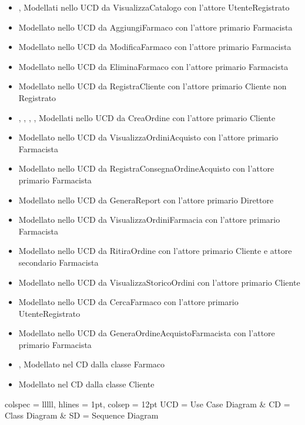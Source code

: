 \begin{itemize}
	\item {},  Modellati nello UCD da VisualizzaCatalogo con l'attore UtenteRegistrato
	\item {} Modellato nello UCD da AggiungiFarmaco con l'attore primario Farmacista
	\item {} Modellato nello UCD da ModificaFarmaco con l'attore primario Farmacista
	\item {} Modellato nello UCD da EliminaFarmaco con l'attore primario Farmacista
	\item {} Modellato nello UCD da RegistraCliente con l'attore primario Cliente non Registrato
	\item {}, , , ,  Modellati nello UCD da CreaOrdine con l'attore primario Cliente
	\item {} Modellato nello UCD da VisualizzaOrdiniAcquisto con l'attore primario Farmacista
	\item {} Modellato nello UCD da RegistraConsegnaOrdineAcquisto con l'attore primario Farmacista
	\item {} Modellato nello UCD da GeneraReport con l'attore primario Direttore
	\item {} Modellato nello UCD da VisualizzaOrdiniFarmacia con l'attore primario Farmacista
	\item {} Modellato nello UCD da RitiraOrdine con l'attore primario Cliente e attore secondario Farmacista
	\item {} Modellato nello UCD da VisualizzaStoricoOrdini con l'attore primario Cliente
	\item {} Modellato nello UCD da CercaFarmaco con l'attore primario UtenteRegistrato
	\item {} Modellato nello UCD da GeneraOrdineAcquistoFarmacista con l'attore primario Farmacista
	\item {},  Modellato nel CD dalla classe Farmaco
	\item {} Modellato nel CD dalla classe Cliente
\end{itemize}

\begin{table}[!hbp]
	\centering
	\begin{tblr}{
		colspec = lllll,
		hlines = {1pt}, colsep = 12pt
		}
		UCD = Use Case Diagram & CD = Class Diagram & SD = Sequence Diagram \\
	\end{tblr}
\end{table}
